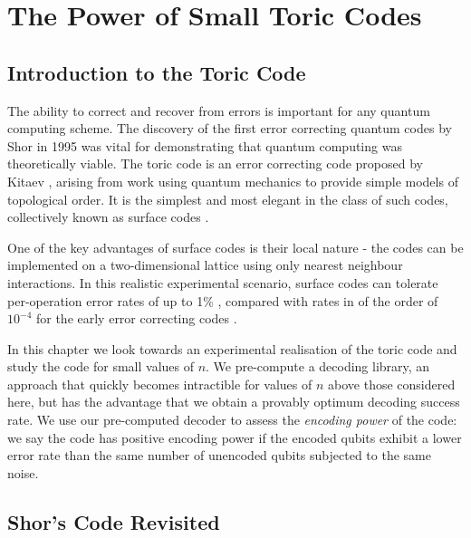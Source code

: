 \chapter{The Power of Small Toric Codes} 
\label{ch:SurfaceCodes}

\section{Introduction to the Toric Code}

The ability to correct and recover from errors is important for any quantum computing scheme. The discovery of the first error correcting quantum codes by Shor in 1995 was vital for demonstrating that quantum computing was theoretically viable. The toric code is an error correcting code proposed by Kitaev \cite{kitaev_1, kitaev_2}, arising from work using quantum mechanics to provide simple models of topological order. It is the simplest and most elegant in the class of such codes, collectively known as surface codes \cite{kitaev_bravyi, planar_codes_freedman_meyer}.

One of the key advantages of surface codes is their local nature - the codes can be implemented on a two-dimensional lattice using only nearest neighbour interactions. In this realistic experimental scenario, surface codes can tolerate per-operation error rates of up to 1\% \cite{fowler11, fowler_classical_processing}, compared with rates in of the order of $10^{-4}$ for the early error correcting codes \cite{steane_code_shit}.

In this chapter we look towards an experimental realisation of the toric code and study the code for small values of $n$. We pre-compute a decoding library, an approach that quickly becomes intractible for values of $n$ above those considered here, but has the advantage that we obtain a provably optimum decoding success rate. We use our pre-computed decoder to assess the \textit{encoding power} of the code: we say the code has positive encoding power if the encoded qubits exhibit a lower error rate than the same number of unencoded qubits subjected to the same noise.

\section{Shor's Code Revisited}

